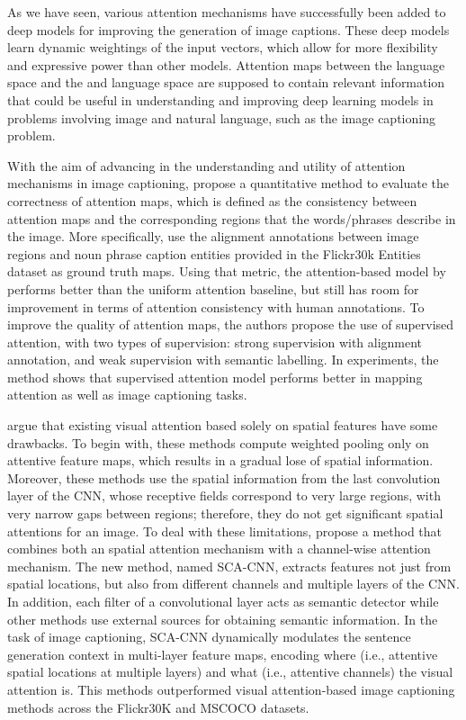 As we have seen, various attention mechanisms have successfully been added to deep models for improving the generation of image captions. These deep models learn dynamic weightings of the input vectors, which allow for more flexibility and expressive power than other models. Attention maps between the language space and the and language space are supposed to contain relevant information that could be useful in understanding and improving deep learning models in problems involving image and natural language, such as the image captioning problem. 

With the aim of advancing in the understanding and utility of attention mechanisms in image captioning, \citet{Liu2017_SAM} propose a quantitative method to evaluate the correctness of attention maps, which is defined as the consistency between attention maps and the corresponding regions that the words/phrases describe in the image. More specifically, \citeauthor{Liu2017_SAM} use the alignment annotations between image regions and noun phrase caption entities provided in the Flickr30k Entities dataset \citep{Plummer2015} as  ground truth maps. Using that metric, the attention-based model by \citet{Xu2015} performs better than the uniform attention baseline, but still has room for improvement in terms of attention consistency with human annotations. To improve the quality of attention maps, the authors propose the use of supervised attention, with two types of supervision: strong supervision with alignment annotation, and weak supervision with semantic labelling. In experiments, the method shows that supervised attention model performs better in mapping attention as well as image captioning tasks.

\citet{Chen2017_SCA} argue that existing visual attention based solely on spatial features have some drawbacks. To begin with, these methods compute weighted pooling only on attentive feature maps, which results in a gradual lose of spatial information. Moreover, these methods use the spatial information from the last convolution layer of the CNN, whose receptive fields correspond to very large regions, with very narrow gaps between regions; therefore, they do not get significant spatial attentions for an image. To deal with these limitations, \citeauthor{Chen2017_SCA} propose a method that combines both an spatial attention mechanism with a channel-wise attention mechanism. The new method, named SCA-CNN, extracts features not just from spatial locations, but also from different channels and multiple layers of the CNN. In addition, each filter of a convolutional layer acts as semantic detector \citep{Zeiler2014} while other methods use external sources for obtaining semantic information. In the task of image captioning, SCA-CNN dynamically modulates the sentence generation context in multi-layer feature maps, encoding where (i.e., attentive spatial locations at multiple layers) and what (i.e., attentive channels) the visual attention is. This methods outperformed visual attention-based image captioning methods across the Flickr30K and MSCOCO datasets.


